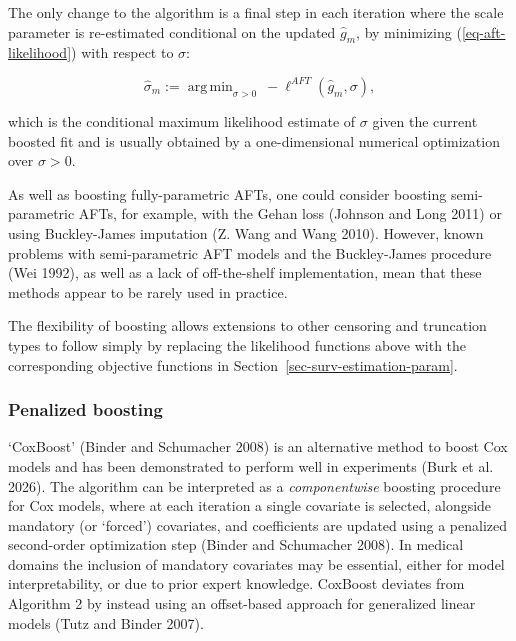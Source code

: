 \documentclass[
  letterpaper,
  krantz2]{style/krantz}
\begin{document}
The only change to the algorithm is a final step in each iteration where
the scale parameter is re-estimated conditional on the updated
\(\hat{g}_m\), by minimizing (\ref{eq-aft-likelihood}) with respect to
\(\sigma\):

\[
\hat{\sigma}_m := \mathop{\mathrm{arg\,min}}_{\sigma > 0} \ -\ell^{AFT}(\hat{g}_m, \sigma),
\]

which is the conditional maximum likelihood estimate of \(\sigma\) given
the current boosted fit and is usually obtained by a one-dimensional
numerical optimization over \(\sigma > 0\).

As well as boosting fully-parametric AFTs, one could consider boosting
semi-parametric AFTs, for example, with the Gehan loss (Johnson and Long
2011) or using Buckley-James imputation (Z. Wang and Wang
2010). However, known
problems with semi-parametric AFT models and the Buckley-James procedure
(Wei 1992), as well as a lack of off-the-shelf implementation, mean that
these methods appear to be rarely used in practice.

The flexibility of boosting allows extensions to other censoring and
truncation types to follow simply by replacing the likelihood functions
above with the corresponding objective functions in
Section~\ref{sec-surv-estimation-param}.

\subsubsection{Penalized boosting}\label{penalized-boosting}

`CoxBoost' (Binder and Schumacher 2008) is an alternative method to
boost Cox models and has been demonstrated to perform well in
experiments (Burk et al. 2026). The algorithm can be interpreted as a
\emph{componentwise} boosting procedure for Cox models, where at each
iteration a single covariate is selected, alongside mandatory (or
`forced') covariates, and coefficients are updated using a penalized
second-order optimization step (Binder and Schumacher
2008).
In medical domains the inclusion of mandatory covariates may be
essential, either for model interpretability, or due to prior expert
knowledge. CoxBoost deviates from Algorithm 2 by instead using an
offset-based approach for generalized linear models (Tutz and Binder
2007).
\end{document}
